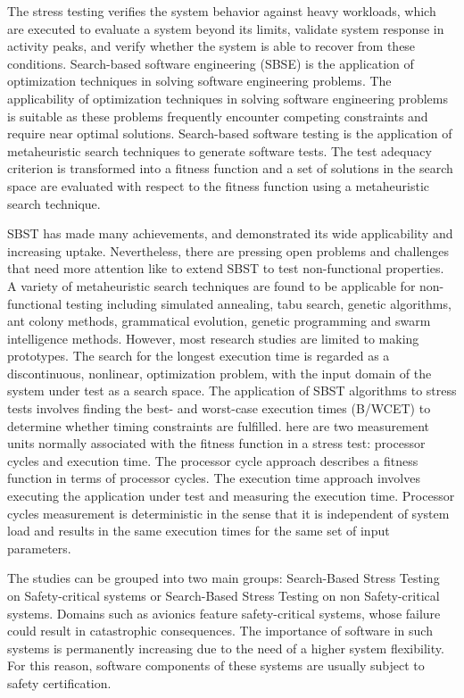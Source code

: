\documentclass[espaco=umemeio,chapter=TITLE,twoside,openright]{abnt}
\begin{document}
The stress testing verifies the system behavior against heavy workloads, which are executed to evaluate a system beyond its limits, validate system response in activity peaks, and verify whether the system is able to recover from these conditions. Search-based software engineering (SBSE) is the application of optimization techniques in solving software engineering problems. The applicability of optimization techniques in solving software engineering problems is suitable as these problems frequently encounter competing constraints and require near optimal solutions.  Search-based software testing is the application of metaheuristic search techniques to generate software tests. The test adequacy criterion is transformed into a fitness function and a set of solutions in the search space are evaluated with respect to the fitness function using a metaheuristic search technique.

SBST has made many achievements, and demonstrated its wide applicability and increasing uptake. Nevertheless, there are pressing open problems and challenges that need more attention like to extend SBST to test non-functional properties. A variety of metaheuristic search techniques are found to be applicable for non-functional testing including simulated annealing, tabu search, genetic algorithms, ant colony methods, grammatical evolution, genetic programming and swarm intelligence methods. However, most research studies are limited to making prototypes. The search for the longest execution time is regarded as a discontinuous, nonlinear, optimization problem, with the input domain of the system under test as a search space.  The application of SBST algorithms to  stress tests involves finding the best- and worst-case execution times (B/WCET) to determine whether timing constraints are fulfilled. here are two measurement units normally associated with the fitness function in a stress test: processor cycles and execution time. The processor cycle approach describes a fitness function in terms of processor cycles. The execution time approach involves executing the application under test and measuring the execution time. Processor cycles measurement is deterministic in the sense that it is independent of system load and results in the same execution times for the same set of input parameters.

The studies can be grouped into two main groups: Search-Based Stress Testing on Safety-critical systems or Search-Based Stress Testing on non Safety-critical systems. Domains such as avionics feature safety-critical systems, whose failure could result in catastrophic consequences.  The importance of software in such systems is permanently increasing due to the need of a higher system
flexibility. For this reason, software components of these systems are usually subject to safety certification. 
\end{document}
